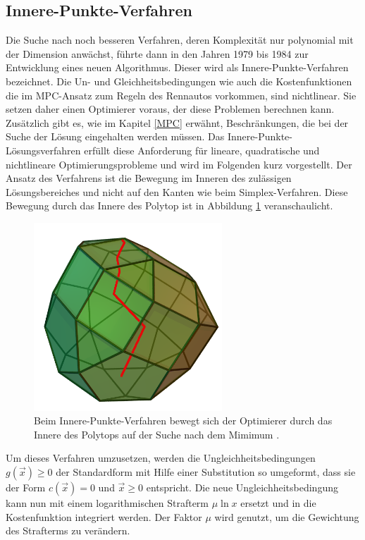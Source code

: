 \documentclass{like}
\begin{document}
\subsection{Innere-Punkte-Verfahren} 
\label{ipm} 
Die Suche nach noch besseren Verfahren, deren Komplexität nur polynomial mit der Dimension anwächst, führte dann in den Jahren 1979 bis 1984 zur Entwicklung eines neuen Algorithmus. Dieser wird als Innere-Punkte-Verfahren bezeichnet. Die Un- und Gleichheitsbedingungen wie auch die Kostenfunktionen die im \ac{MPC}-Ansatz zum Regeln des Rennautos vorkommen, sind nichtlinear. Sie setzen daher einen Optimierer voraus, der diese Problemen berechnen kann. Zusätzlich gibt es, wie im Kapitel \ref{MPC} erwähnt, Beschränkungen, die bei der Suche der Lösung eingehalten werden müssen. Das Innere-Punkte-Lösungsverfahren erfüllt diese Anforderung für lineare, quadratische und nicht\-li\-ne\-are Optimierungsprobleme und wird im Folgenden kurz vorgestellt. Der Ansatz des Verfahrens ist die Bewegung im Inneren des zulässigen Lösungsbereiches und nicht auf den Kanten wie beim Simplex-Verfahren. Diese Bewegung durch das Innere des Polytop ist in Abbildung \ref{fig:iterPointMethod} veranschaulicht.  
\begin{figure}[ht!]
	\centering
	\includegraphics[width=200pt]{Abbildungen/iterPointMethod.png}
	\caption{Beim Innere-Punkte-Verfahren bewegt sich der Optimierer durch das Innere des Polytops auf der Suche nach dem Mimimum  \cite{InnerePunkteVerfahren:1}.}
	\label{fig:iterPointMethod}
\end{figure}

Um dieses Verfahren umzusetzen, werden die Ungleichheitsbedingungen $g(\vec{x}) \geq 0$ der Standardform mit Hilfe einer Substitution so umgeformt, dass sie der Form $c(\vec{x}) = 0$ und $\vec{x} \geq  0$ entspricht. Die neue Ungleichheitsbedingung kann nun mit einem logarithmischen Strafterm $ \mu \ln x $  ersetzt und in die Kostenfunktion integriert werden. 
Der Faktor $\mu$ wird genutzt, um die Gewichtung des Strafterms zu verändern.
\end{document}
